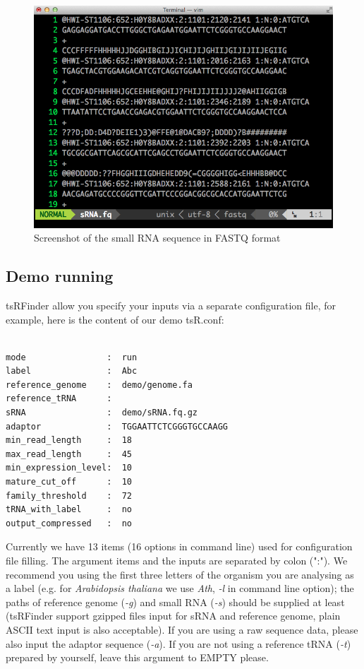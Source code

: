 \documentclass[11pt, a4paper]{article}
\begin{document}
\begin{figure}[htbp]
\begin{center}
\includegraphics[width=12cm]{fastq.png}
\caption{Screenshot of the small RNA sequence in FASTQ format} 
\label{fastq}
\end{center}
\end{figure}

\subsection{Demo running}

tsRFinder allow you specify your inputs via a separate configuration file, for example, here is the content of our demo tsR.conf:

{\footnotesize \begin{tcolorbox}[colback=blue!5!white,colframe=blue!75!black,title=Demo configuration file for tsRFinder: demo/tsR.conf]
\begin{verbatim}

mode                :  run
label               :  Abc
reference_genome    :  demo/genome.fa
reference_tRNA      :
sRNA                :  demo/sRNA.fq.gz
adaptor             :  TGGAATTCTCGGGTGCCAAGG
min_read_length     :  18
max_read_length     :  45
min_expression_level:  10
mature_cut_off      :  10
family_threshold    :  72
tRNA_with_label     :  no
output_compressed   :  no

\end{verbatim}
\end{tcolorbox}}

Currently we have 13 items (16 options in command line) used for configuration file filling. The argument items and the inputs are separated by colon (":"). We recommend you using the first three letters of the organism you are analysing as a label (e.g. for \textit{Arabidopsis thaliana} we use \textit{Ath}, \emph{-l} in command line option); the paths of reference genome (\emph{-g}) and small RNA (\emph{-s}) should be supplied at least (tsRFinder support gzipped files input for sRNA and reference genome, plain ASCII text input is also acceptable). If you are using a raw sequence data, please also input the adaptor sequence (\emph{-a}). If you are not using a reference tRNA (\emph{-t}) prepared by yourself, leave this argument to EMPTY please.
\end{document}
